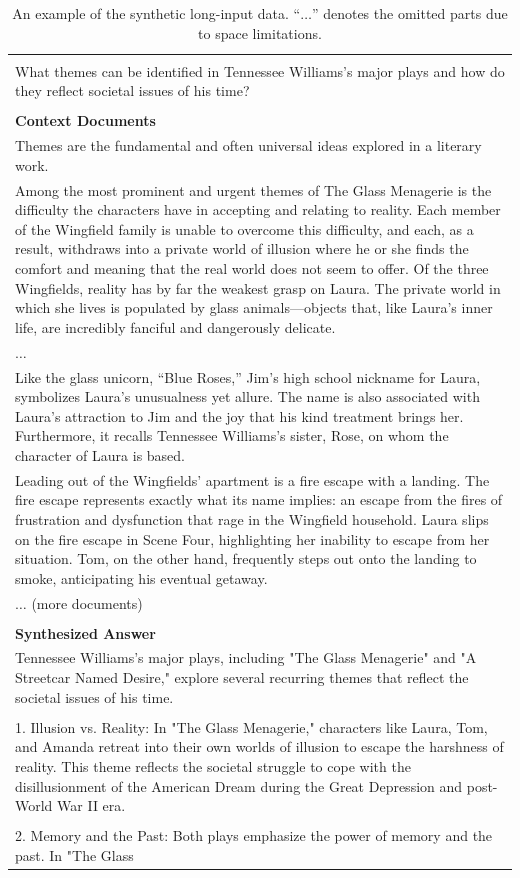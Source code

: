 \documentclass{article}
\begin{document}
\begin{table}[ht]
\centering
\caption{An example of the synthetic long-input data.
``$\ldots$'' denotes the omitted parts due to space limitations.}
\label{tab:app_long_context_example}
\small{\begin{tabular}{l}
\hline
\begin{tabular}[c]{@{}p{0.97\linewidth}@{}}\textbf{Instruction}\\What themes can be identified in Tennessee Williams's major plays and how do they reflect societal issues of his time?\\\\ \textbf{Context Documents}\\Themes are the fundamental and often universal ideas explored in a literary work.\\Among the most prominent and urgent themes of The Glass Menagerie is the difficulty the characters have in accepting and relating to reality. Each member of the Wingfield family is unable to overcome this difficulty, and each, as a result, withdraws into a private world of illusion where he or she finds the comfort and meaning that the real world does not seem to offer. Of the three Wingfields, reality has by far the weakest grasp on Laura. The private world in which she lives is populated by glass animals—objects that, like Laura’s inner life, are incredibly fanciful and dangerously delicate. \\ $\ldots$ \\Like the glass unicorn, “Blue Roses,” Jim’s high school nickname for Laura, symbolizes Laura’s unusualness yet allure. The name is also associated with Laura’s attraction to Jim and the joy that his kind treatment brings her. Furthermore, it recalls Tennessee Williams’s sister, Rose, on whom the character of Laura is based.\\Leading out of the Wingfields’ apartment is a fire escape with a landing. The fire escape represents exactly what its name implies: an escape from the fires of frustration and dysfunction that rage in the Wingfield household. Laura slips on the fire escape in Scene Four, highlighting her inability to escape from her situation. Tom, on the other hand, frequently steps out onto the landing to smoke, anticipating his eventual getaway.\\ $\ldots$ (more documents)\\\\ \textbf{Synthesized Answer}\\Tennessee Williams's major plays, including "The Glass Menagerie" and "A Streetcar Named Desire," explore several recurring themes that reflect the societal issues of his time.\\\\1. Illusion vs. Reality: In "The Glass Menagerie," characters like Laura, Tom, and Amanda retreat into their own worlds of illusion to escape the harshness of reality. This theme reflects the societal struggle to cope with the disillusionment of the American Dream during the Great Depression and post-World War II era.\\\\2. Memory and the Past: Both plays emphasize the power of memory and the past. In "The Glass 
\end{tabular}}
\end{table}
\end{document}
